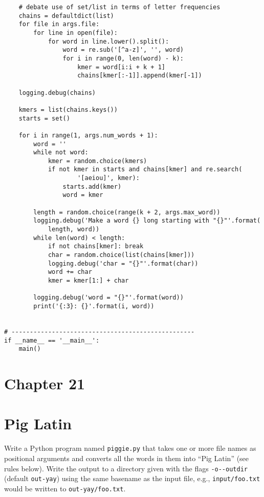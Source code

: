 \documentclass[]{article}
\begin{document}
\begin{verbatim}
    # debate use of set/list in terms of letter frequencies
    chains = defaultdict(list)
    for file in args.file:
        for line in open(file):
            for word in line.lower().split():
                word = re.sub('[^a-z]', '', word)
                for i in range(0, len(word) - k):
                    kmer = word[i:i + k + 1]
                    chains[kmer[:-1]].append(kmer[-1])

    logging.debug(chains)

    kmers = list(chains.keys())
    starts = set()

    for i in range(1, args.num_words + 1):
        word = ''
        while not word:
            kmer = random.choice(kmers)
            if not kmer in starts and chains[kmer] and re.search(
                    '[aeiou]', kmer):
                starts.add(kmer)
                word = kmer

        length = random.choice(range(k + 2, args.max_word))
        logging.debug('Make a word {} long starting with "{}"'.format(
            length, word))
        while len(word) < length:
            if not chains[kmer]: break
            char = random.choice(list(chains[kmer]))
            logging.debug('char = "{}"'.format(char))
            word += char
            kmer = kmer[1:] + char

        logging.debug('word = "{}"'.format(word))
        print('{:3}: {}'.format(i, word))


# --------------------------------------------------
if __name__ == '__main__':
    main()
\end{verbatim}

\pagebreak

\hypertarget{chapter-21}{%
\section{Chapter 21}\label{chapter-21}}

\hypertarget{pig-latin}{%
\section{Pig Latin}\label{pig-latin}}

Write a Python program named \texttt{piggie.py} that takes one or more
file names as positional arguments and converts all the words in them
into ``Pig Latin'' (see rules below). Write the output to a directory
given with the flags \texttt{-o\textbar{}-\/-outdir} (default
\texttt{out-yay}) using the same basename as the input file, e.g.,
\texttt{input/foo.txt} would be written to \texttt{out-yay/foo.txt}.
\end{document}

